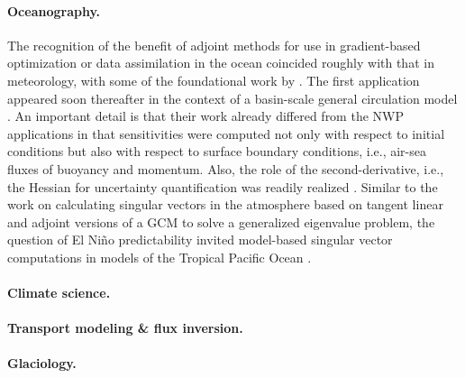 \paragraph{Oceanography.}
The recognition of the benefit of adjoint methods for use in gradient-based optimization or data assimilation in the ocean coincided roughly with that in meteorology, with some of the foundational work by \cite{Thacker:1988kp,Thacker:1988ed}. 
The first application appeared soon thereafter in the context of a basin-scale general circulation model \cite{Tziperman.1989,Tziperman:1992hg,Tziperman:1992jw}. 
An important detail is that their work already differed from the NWP applications in that sensitivities were computed not only with respect to initial conditions but also with respect to surface boundary conditions, i.e., air-sea fluxes of buoyancy and momentum.
Also, the role of the second-derivative, i.e., the Hessian for uncertainty quantification was readily realized \cite{Thacker:1989jf}.
Similar to the work on calculating singular vectors in the atmosphere based on tangent linear and adjoint versions of a GCM to solve a generalized eigenvalue problem, the question of El Niño predictability invited model-based singular vector computations in models of the Tropical Pacific Ocean \cite{Moore:1997ci,Moore:1997fp}.


\paragraph{Climate science.}

\paragraph{Transport modeling \& flux inversion.}

\paragraph{Glaciology.}

